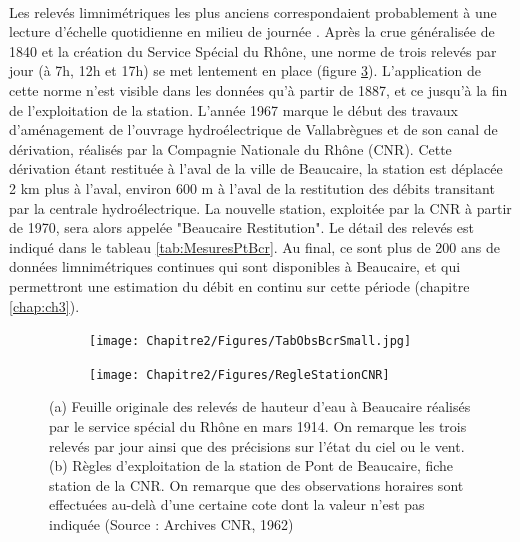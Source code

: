 	\paragraph{} Les relevés limnimétriques les plus anciens correspondaient probablement à une lecture d'échelle quotidienne en milieu de journée \citep{pichard_hauteurs_2013}. Après la crue généralisée de 1840 et la création du Service Spécial du Rhône, une norme de trois relevés par jour (à 7h, 12h et 17h) se met lentement en place (figure \ref{fig:RelevesPt}). L'application de cette norme n'est visible dans les données qu'à partir de 1887, et ce jusqu'à la fin de l'exploitation de la station.  L'année 1967 marque le début des travaux d'aménagement de l'ouvrage hydroélectrique de Vallabrègues et de son canal de dérivation, réalisés par la Compagnie Nationale du Rhône (CNR). Cette dérivation étant restituée à l'aval de la ville de Beaucaire, la station est déplacée 2 km plus à l'aval, environ 600 m à l'aval de la restitution des débits transitant par la centrale hydroélectrique. La nouvelle station, exploitée par la CNR à partir de 1970, sera alors appelée "Beaucaire Restitution". Le détail des relevés est indiqué dans le tableau \ref{tab:MesuresPtBcr}. Au final, ce sont plus de 200 ans de données limnimétriques continues qui sont disponibles à Beaucaire, et qui permettront une estimation du débit en continu sur cette période (chapitre \ref{chap:ch3}). 
	
	\begin{figure}[h]
          \centering
            \begin{subfigure}{0.49\linewidth}
            \centering
            	\texttt{[image: Chapitre2/Figures/TabObsBcrSmall.jpg]}\hfill
            	\caption{}
            	\label{subfig:TabObsPt}
            \end{subfigure}
            \begin{subfigure}{0.49\linewidth}
            \centering
            	\texttt{[image: Chapitre2/Figures/RegleStationCNR]}
            	\caption{}
           		\label{subfig:RegleCNR}
            \end{subfigure}
      \caption{(a) Feuille originale des relevés de hauteur d'eau à Beaucaire réalisés par le service spécial du Rhône en mars 1914. On remarque les trois relevés par jour ainsi que des précisions sur l'état du ciel ou le vent. (b) Règles d'exploitation de la station de Pont de Beaucaire, fiche station de la CNR. On remarque que des observations horaires sont effectuées au-delà d'une certaine cote dont la valeur n'est pas indiquée (Source : Archives CNR, 1962)}
	 \label{fig:RelevesPt}
	\end{figure}            
            
